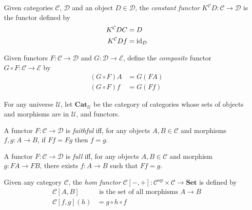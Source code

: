 \begin{df}
    Given categories $\mathcal{C}$, $\mathcal{D}$ and an object $D \in \mathcal{D}$, the \emph{constant functor} $K^\mathcal{C} D : \mathcal{C} \rightarrow \mathcal{D}$ is the functor defined by
    \begin{align*}
        K^\mathcal{C} D C & = D      \\
        K^\mathcal{C} D f & = \mathrm{id}_{D}
    \end{align*}
\end{df}

\begin{df}
Given functors $F : \mathcal{C} \rightarrow \mathcal{D}$ and $G : \mathcal{D} \rightarrow \mathcal{E}$, define the \emph{composite} functor $G \circ F : \mathcal{C} \rightarrow \mathcal{E}$ by
\begin{align*}
(G \circ F) A & = G (F A) \\
(G \circ F) f & = G (F f)
\end{align*}
\end{df}

\begin{df}
For any universe $\mathcal{U}$, let $\mathbf{Cat}_\mathcal{U}$ be the category of categories whose sets of objects and morphisms are in $\mathcal{U}$, and functors.
\end{df}

\begin{df}[Faithful]
A functor $F : \mathcal{C} \rightarrow \mathcal{D}$ is \emph{faithful} iff, for any objects $A,B \in \mathcal{C}$ and morphisms $f,g : A \rightarrow B$, if $Ff = Fg$ then $f = g$.
\end{df}

\begin{df}[Full]
A functor $F : \mathcal{C} \rightarrow \mathcal{D}$ is \emph{full} iff, for any objects $A, B \in \mathcal{C}$ and morphism $g : FA \rightarrow FB$, there exists $f : A \rightarrow B$ such that $Ff = g$.
\end{df}

\begin{df}
Given any category $\mathcal{C}$, the \emph{hom functor} $\mathcal{C}[-,+] : \mathcal{C}^\mathrm{op} \times \mathcal{C} \rightarrow \mathbf{Set}$ is defined by
\begin{align*}
\mathcal{C}[A,B] & \text{ is the set of all morphisms } A \rightarrow B \\
\mathcal{C}[f,g](h) & = g \circ h \circ f
\end{align*}
\end{df}


